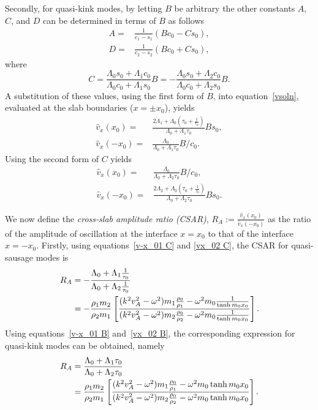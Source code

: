 \documentclass[namedreferences]{solarphysics}
\numberwithin{equation}{section}
\begin{document}
\begin{article}
Secondly, for quasi-kink modes, by letting $B$ be arbitrary the other constants $A$, $C$, and $D$ can be determined in terms of $B$ as follows
\begin{align}
A=&\frac{1}{c_1-s_1}(Bc_0-Cs_0), \label{constA B} \\ 
D=&\frac{1}{c_2-s_2}(Bc_0+Cs_0), \label{constD B}
\end{align}
where
\begin{equation}
C=\frac{\Lambda_0s_0+\Lambda_1c_0}{\Lambda_0c_0+\Lambda_1s_0}B=-\frac{\Lambda_0s_0+\Lambda_2c_0}{\Lambda_0c_0+\Lambda_2s_0}B. \label{constB B}
\end{equation}
A substitution of these values, using the first form of $B$, into equation~\eqref{vsoln}, evaluated at the slab boundaries ($x=\pm{}x_0$), yields
\begin{align}
\widehat{v}_x(x_0)=&\frac{2\Lambda_1+\Lambda_0\left(\tau_0+\frac{1}{\tau_0}\right)}{\Lambda_0+\Lambda_1\tau_0}Bs_0, \label{vx_01 B} \\
\widehat{v}_x(-x_0)=&\frac{\Lambda_0}{\Lambda_0+\Lambda_1\tau_0}B/c_0. \label{v-x_01 B}
\end{align}
Using the second form of $C$ yields
\begin{align}
\widehat{v}_x(x_0)=&\frac{\Lambda_0}{\Lambda_0+\Lambda_2\tau_0}B/c_0, \label{vx_02 B} \\
\widehat{v}_x(-x_0)=&\frac{2\Lambda_2+\Lambda_0\left(\tau_0+\frac{1}{\tau_0}\right)}{\Lambda_0+\Lambda_2\tau_0}Bs_0. \label{v-x_02 B}
\end{align}


We now define the \emph{cross-slab amplitude ratio (CSAR)}, $R_A:=\frac{\widehat{v}_x(x_0)}{\widehat{v}_x(-x_0)}$ as the ratio of the amplitude of oscillation at the interface $x=x_0$ to that of the interface $x=-x_0$. Firstly, using equations~\eqref{v-x_01 C} and \eqref{vx_02 C}, the CSAR for quasi-sausage modes is
\begin{align}
R_A &=-\frac{\Lambda_0+\Lambda_1\frac{1}{\tau_0}}{\Lambda_0+\Lambda_2\frac{1}{\tau_0}} \notag \\
	&=-\frac{\rho_1m_2}{\rho_2m_1}\left[\frac{(k^2v_A^2-\omega^2)m_1\frac{\rho_0}{\rho_1}-\omega^2m_0\frac{1}{\tanh{m_0x_0}}}{(k^2v_A^2-\omega^2)m_2\frac{\rho_0}{\rho_2}-\omega^2m_0\frac{1}{\tanh{m_0x_0}}}\right]. \label{cross-slab ratio1}
\end{align}
Using equations~\eqref{v-x_01 B} and~\eqref{vx_02 B}, the corresponding expression for quasi-kink modes can be obtained, namely
\begin{align}
R_A&=\frac{\Lambda_0+\Lambda_1\tau_0}{\Lambda_0+\Lambda_2\tau_0} \notag \\
	&=\frac{\rho_1m_2}{\rho_2m_1}\left[\frac{(k^2v_A^2-\omega^2)m_1\frac{\rho_0}{\rho_1}-\omega^2m_0\tanh{m_0x_0}}{(k^2v_A^2-\omega^2)m_2\frac{\rho_0}{\rho_2}-\omega^2m_0\tanh{m_0x_0}}\right]. \label{cross-slab ratio2}
\end{align}


\end{article}
\end{document}
